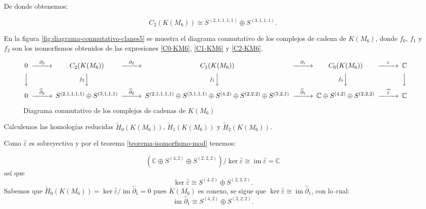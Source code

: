 \documentclass[12pt]{book}
\theoremstyle{definition}
\DeclareMathOperator{\im}{im}
\newcounter{in}
\begin{document}
De donde obtenemos:

\begin{equation}
  C_{2}(K(M_{6}))\cong S^{(2,1,1,1,1)}\oplus S^{(3,1,1,1)}.
  \label{C2-KM6}
\end{equation}

En la figura \ref{fig:diagrama-conmutativo-clanes5} se muestra el diagrama
conmutativo de los complejos de cadena de $K(M_{6})$, donde $f_{0}$,
$f_{1}$ y $f_{2}$ son los isomorfismos obtenidos de las expresiones
\ref{C0-KM6}, \ref{C1-KM6} y \ref{C2-KM6}.

\begin{sidewaysfigure}%
  {\small
    \[
    \begin{CD}
      0 @>{\partial_{3}}>> C_{2}(K(M_{6})) @>{\partial_{2}}>> C_{1}(K(M_{6})) @>{\partial_{1}}>> C_{0}(K(M_{6})) @>{\varepsilon}>> \mathbb{C}\\
      @VVV   @Vf_{2}VV   @Vf_{1}VV   @Vf_{0}VV   @VVV    \\
      0  @>{\widehat\partial_{3}}>> S^{(2,1,1,1,1)}\oplus S^{(3,1,1,1)} @>{\widehat\partial_{2}}>>
      S^{(2,1,1,1,1)}\oplus S^{(3,1,1,1)}\oplus S^{(4,2)}\oplus
      S^{(2,2,2)}\oplus S^{(3,2,1)} @>{\widehat\partial_{1}}>>
      \mathbb{C} \oplus S^{(4,2)}\oplus S^{(2,2,2)} @>{\widehat
        \varepsilon}>> \mathbb{C}
    \end{CD}
    \]
  }
  
  \caption{Diagrama conmutativo de los complejos de cadenas de $K(M_{6})$}
  \label{fig:diagrama-conmutativo-clanes6}
\end{sidewaysfigure}

Calculemos las homologías reducidas $\widetilde H_{0}(K(M_{6}))$,
$\widetilde H_{1}(K(M_{6}))$ y $\widetilde H_{2}(K(M_{6}))$.

Como $\widehat\varepsilon$ es sobreyectiva y por el teorema
\ref{teorema-isomorfismo-mod} tenemos:

\begin{equation*}
  (\mathbb{C} \oplus S^{(4,2)}\oplus S^{(2,2,2)})/\ker\widehat\varepsilon\cong \im \widehat\varepsilon=\mathbb{C}
\end{equation*}
así que
\begin{equation*}
  \label{ker0-KM6}
  \ker\widehat\varepsilon\cong S^{(4,2)}\oplus S^{(2,2,2)}.
\end{equation*}
Sabemos que $\widetilde H_{0}(K(M_{6}))=\ker \widehat\varepsilon/\im
\widehat\partial_{1}=0$ pues $K(M_{6})$ es conexo, se sigue que $\ker \widehat\varepsilon\cong
\im\widehat\partial_{1}$, con lo cual:
\begin{equation}
  \label{im1-KM6}
  \im \widehat\partial_{1}\cong S^{(4,2)}\oplus S^{(2,2,2)}.
\end{equation}
\end{document}
